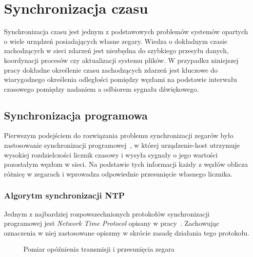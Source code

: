 \chapter{Synchronizacja czasu}\label{chap:time_sync}

Synchronizacja czasu jest jednym z podstawowych problemów systemów opartych o wiele urządzeń posiadających własne zegary. Wiedza o dokładnym czasie zachodzących w sieci zdarzeń jest niezbędna do szybkiego przesyłu danych, koordynacji procesów czy aktualizacji systemu plików. W przypadku niniejszej pracy dokładne określenie czasu zachodzących zdarzeń jest kluczowe do wiarygodnego określenia odległości pomiędzy węzłami na podstawie interwału czasowego pomiędzy nadaniem a odbiorem sygnału dźwiękowego.

\section{Synchronizacja programowa}\label{sec:prog_sync}

Pierwszym podejściem do rozwiązania problemu synchronizacji zegarów było zastosowanie synchronizacji programowej~\cite{6066334}, w której urządzenie-host utrzymuje wysokiej rozdzielczości licznik czasowy i wysyła sygnały o jego wartości pozostałym węzłom w sieci. Na podstawie tych informacji każdy z węzłów oblicza różnicę w zegarach i wprowadza odpowiednie przesunięcie własnego licznika.

\subsection{Algorytm synchronizacji NTP}\label{sec:ntp_sync}

Jednym z najbardziej rozpowszechnionych protokołów synchronizacji programowej jest \textit{Network Time Protocol} opisany w pracy~\cite{103043}. Zachowując oznaczenia w niej zastosowane opiszmy w skrócie zasadę działania tego protokołu.

\begin{figure}[H]
    \centering
    \caption{Pomiar opóźnienia transmisji i przesunięcia zegara}
    \label{fig:ntp}
\end{figure}

